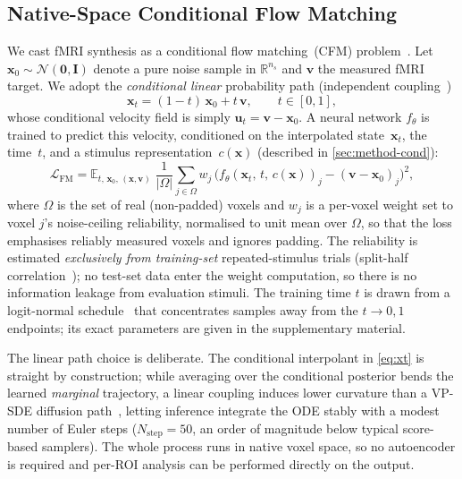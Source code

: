 \documentclass[runningheads]{llncs}
\begin{document}
\subsection{Native-Space Conditional Flow Matching}
\label{sec:method-flow}

We cast fMRI synthesis as a conditional flow matching~(CFM)
problem~\cite{lipman2023,rectifiedflow}.
Let $\mathbf{x}_0 \sim \mathcal{N}(\mathbf{0}, \mathbf{I})$ denote a pure noise sample
in $\mathbb{R}^{n_s}$ and $\mathbf{v}$ the measured fMRI target.
We adopt the \emph{conditional linear} probability path (independent coupling~\cite{lipman2023})
\begin{equation}
  \mathbf{x}_t = (1 - t)\,\mathbf{x}_0 + t\,\mathbf{v}, \qquad t \in [0, 1],
  \label{eq:xt}
\end{equation}
whose conditional velocity field is simply
$\mathbf{u}_t = \mathbf{v} - \mathbf{x}_0$.
A neural network $f_\theta$ is trained to predict this velocity, conditioned on the
interpolated state~$\mathbf{x}_t$, the time~$t$, and a stimulus
representation~$c(\mathbf{x})$ (described in \cref{sec:method-cond}):
\begin{equation}
  \mathcal{L}_{\text{FM}}
    = \mathbb{E}_{t,\,\mathbf{x}_0,\,(\mathbf{x},\mathbf{v})}\;
      \frac{1}{|\Omega|}\sum_{j\in\Omega} w_j\,
      \big( f_\theta(\mathbf{x}_t,\, t,\, c(\mathbf{x}))_j
        - (\mathbf{v} - \mathbf{x}_0)_j \big)^2,
  \label{eq:fm}
\end{equation}
where $\Omega$ is the set of real (non-padded) voxels and $w_j$ is a per-voxel
weight set to voxel $j$'s noise-ceiling reliability, normalised to unit mean
over $\Omega$, so that the loss emphasises reliably measured voxels and ignores
padding.
The reliability is estimated \emph{exclusively from training-set} repeated-stimulus
trials (split-half correlation~\cite{nsd}); no test-set data enter the weight
computation, so there is no information leakage from evaluation stimuli. The training time $t$ is drawn from a logit-normal
schedule~\cite{esser2024sd3} that concentrates samples away from the
$t\!\to\!0,1$ endpoints; its exact parameters are given in the supplementary
material.

The linear path choice is deliberate. The conditional interpolant in \cref{eq:xt} is
straight by construction; while averaging over the conditional posterior bends the learned
\emph{marginal} trajectory, a linear coupling induces lower curvature than a VP-SDE diffusion
path~\cite{rectifiedflow}, letting inference integrate the ODE stably with a modest number of
Euler steps ($N_\text{step}{=}50$, an order of magnitude below typical score-based samplers).
The whole process runs in native voxel space, so no autoencoder is required and per-ROI
analysis can be performed directly on the output.
\end{document}
